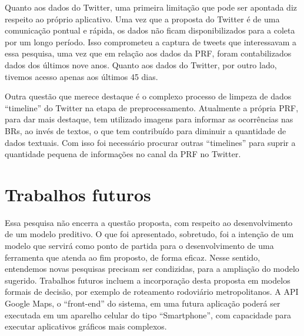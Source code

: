 Quanto aos dados do Twitter, uma primeira limitação que pode ser apontada diz respeito ao próprio aplicativo. Uma vez que a proposta do Twitter é de uma comunicação pontual e rápida, os dados não ficam disponibilizados para a coleta por um longo período. Isso comprometeu a captura de tweets que interessavam a essa pesquisa, uma vez que em relação aos dados da PRF, foram contabilizados dados dos últimos nove anos. Quanto aos dados do Twitter, por outro lado, tivemos acesso apenas aos últimos 45 dias.

Outra questão que merece destaque é o complexo processo de limpeza de dados ``timeline'' do Twitter na etapa de preprocessamento. Atualmente a própria PRF, para dar mais destaque, tem utilizado imagens para informar as ocorrências nas BRs, ao invés de textos, o que tem contribuído para diminuir a quantidade de dados textuais. Com isso foi necessário procurar outras ``timelines'' para suprir a quantidade pequena de informações no canal da PRF no Twitter.

\pagebreak

\section{Trabalhos futuros}

Essa pesquisa não encerra a questão proposta, com respeito ao desenvolvimento de um modelo preditivo. O que foi apresentado, sobretudo, foi a intenção de um modelo que servirá como ponto de partida para o desenvolvimento de uma ferramenta que atenda ao fim proposto, de forma eficaz. Nesse sentido, entendemos novas pesquisas precisam ser condizidas, para a ampliação do modelo sugerido. 
Trabalhos futuros incluem a incorporação desta proposta
em modelos formais de decisão, por exemplo de roteamento
rodoviário metropolitanos. A API Google Maps, o ``front-end'' do sistema, em uma futura aplicação poderá ser executada em um aparelho 
celular do tipo ``Smartphone'', com capacidade para executar aplicativos gráficos mais complexos.